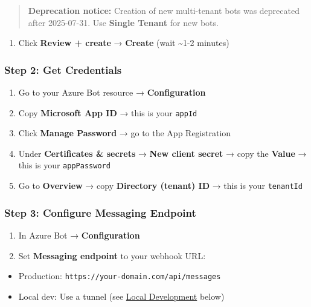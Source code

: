 \begin{quote}
\textbf{Deprecation notice:} Creation of new multi-tenant bots was deprecated after 2025-07-31. Use \textbf{Single Tenant} for new bots.
\end{quote}


\begin{enumerate}
  \item Click \textbf{Review + create} → \textbf{Create} (wait \textasciitilde{}1-2 minutes)
\end{enumerate}


\subsubsection{Step 2: Get Credentials}


\begin{enumerate}
  \item Go to your Azure Bot resource → \textbf{Configuration}
  \item Copy \textbf{Microsoft App ID} → this is your \texttt{appId}
  \item Click \textbf{Manage Password} → go to the App Registration
  \item Under \textbf{Certificates \& secrets} → \textbf{New client secret} → copy the \textbf{Value} → this is your \texttt{appPassword}
  \item Go to \textbf{Overview} → copy \textbf{Directory (tenant) ID} → this is your \texttt{tenantId}
\end{enumerate}


\subsubsection{Step 3: Configure Messaging Endpoint}


\begin{enumerate}
  \item In Azure Bot → \textbf{Configuration}
  \item Set \textbf{Messaging endpoint} to your webhook URL:
\end{enumerate}

\begin{itemize}
  \item Production: \texttt{https://your-domain.com/api/messages}
  \item Local dev: Use a tunnel (see \href{\#local-development-tunneling}{Local Development} below)
\end{itemize}


